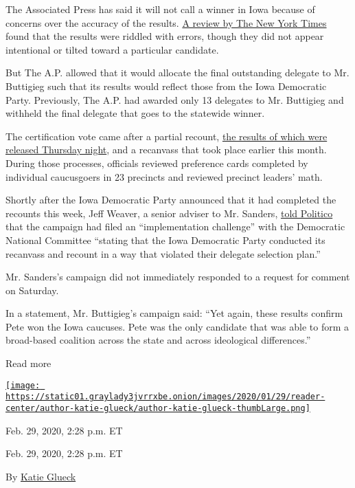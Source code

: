 The Associated Press has said it will not call a winner in Iowa because
of concerns over the accuracy of the results.
\href{https://www.nytimes3xbfgragh.onion/2020/02/06/upshot/iowa-caucuses-errors-results.html}{A
review by The New York Times} found that the results were riddled with
errors, though they did not appear intentional or tilted toward a
particular candidate.

But The A.P. allowed that it would allocate the final outstanding
delegate to Mr. Buttigieg such that its results would reflect those from
the Iowa Democratic Party. Previously, The A.P. had awarded only 13
delegates to Mr. Buttigieg and withheld the final delegate that goes to
the statewide winner.

The certification vote came after a partial recount,
\href{https://www.nytimes3xbfgragh.onion/live/2020/south-carolina-primary-02-27\#iowa-is-sort-of-maybe-actually-over}{the
results of which were released Thursday night}, and a recanvass that
took place earlier this month. During those processes, officials
reviewed preference cards completed by individual caucusgoers in 23
precincts and reviewed precinct leaders' math.

Shortly after the Iowa Democratic Party announced that it had completed
the recounts this week, Jeff Weaver, a senior adviser to Mr. Sanders,
\href{https://www.politico.com/news/2020/02/27/buttigieg-iowa-caucus-recount-118044}{told
Politico} that the campaign had filed an ``implementation challenge''
with the Democratic National Committee ``stating that the Iowa
Democratic Party conducted its recanvass and recount in a way that
violated their delegate selection plan.''

Mr. Sanders's campaign did not immediately responded to a request for
comment on Saturday.

In a statement, Mr. Buttigieg's campaign said: ``Yet again, these
results confirm Pete won the Iowa caucuses. Pete was the only candidate
that was able to form a broad-based coalition across the state and
across ideological differences.''

Read more

\href{https://www.nytimes3xbfgragh.onion/by/katie-glueck}{\texttt{[image: https://static01.graylady3jvrrxbe.onion/images/2020/01/29/reader-center/author-katie-glueck/author-katie-glueck-thumbLarge.png]}}

Feb. 29, 2020, 2:28 p.m. ET

Feb. 29, 2020, 2:28 p.m. ET

By \href{https://www.nytimes3xbfgragh.onion/by/katie-glueck}{Katie
Glueck}

